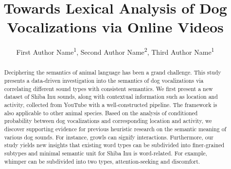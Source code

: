 \documentclass[letterpaper]{article}
\title{Towards Lexical Analysis of Dog Vocalizations via Online Videos}
\author {
    First Author Name\textsuperscript{\rm 1},
    Second Author Name\textsuperscript{\rm 2},
    Third Author Name\textsuperscript{\rm 1}
}
\newcommand{\KZ}[1]{\textcolor{blue}{(Kenny: #1)}}
\newcommand{\MY}[1]{\textcolor{blue}{(Mengyue: #1)}}
\newcommand{\AT}[1]{\textcolor{red}{(Arthur: #1)}}
\begin{document}
\maketitle
\begin{abstract}
Deciphering the semantics of animal language has been a grand challenge.
This study presents a data-driven investigation into the semantics of dog vocalizations via correlating different sound types with consistent semantics. 
We first present a new dataset of Shiba Inu sounds, along with contextual information such as location and activity, collected from YouTube with a well-constructed pipeline. The framework is also applicable to other animal species. Based on the analysis of conditioned probability between dog vocalizations and corresponding location and activity, we discover supporting evidence for previous heuristic research on the semantic meaning of various dog sounds. For instance, growls can signify interactions. Furthermore, our study yields new insights that existing word types can be subdivided into finer-grained subtypes and minimal semantic unit for Shiba Inu is word-related. For example, whimper can be subdivided into two types, attention-seeking and discomfort. 
 
\end{abstract}










%

%
\end{document}
